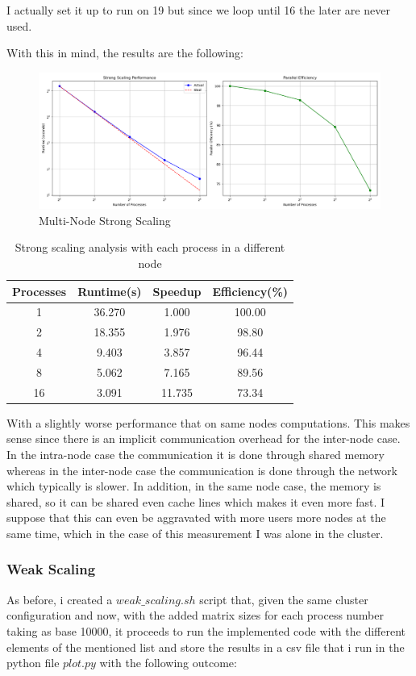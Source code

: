 \documentclass[unicode,11pt,a4paper,oneside,numbers=endperiod,openany]{scrartcl}
\begin{document}
I actually set it up to run on 19 but since we loop until 16 the later are never used.

With this in mind, the results are the following: 

\begin{figure}[H]
    \centering
    \includegraphics[width=\textwidth]{./img/exe4/strong_scaling-multi.png}
    \caption{Multi-Node Strong Scaling}
  \end{figure}

\begin{table}[h!]
\centering
\begin{tabular}{|c|c|c|c|}
\hline
Processes & Runtime(s) & Speedup & Efficiency(\%) \\
\hline
1 & 36.270 & 1.000 & 100.00 \\
2 & 18.355 & 1.976 & 98.80 \\
4 & 9.403 & 3.857 & 96.44 \\
8 & 5.062 & 7.165 & 89.56 \\
16 & 3.091 & 11.735 & 73.34 \\
\hline
\end{tabular}
\caption{Strong scaling analysis with each process in a different node}
\end{table}

With a slightly worse performance that on same nodes computations. This makes sense since
there is an implicit communication overhead for the inter-node case. In the intra-node case the communication
it is done through shared memory whereas in the inter-node case the communication is done through the network 
which typically is slower. In addition, in the same node case, the memory is shared, so it can be shared even cache lines 
which makes it even more fast. I suppose that this can even be aggravated with more users more nodes at the same time, which 
in the case of this measurement I was alone in the cluster. 

\subsubsection{Weak Scaling}
As before, i created a $weak\_scaling.sh$ script that, given the same cluster configuration and now, with the added matrix sizes for each
process number taking as base 10000, it proceeds to run the implemented code with the different elements of the mentioned list and store the results in a csv file that i run in the 
python file $plot.py$ with the following outcome: 
\end{document}
